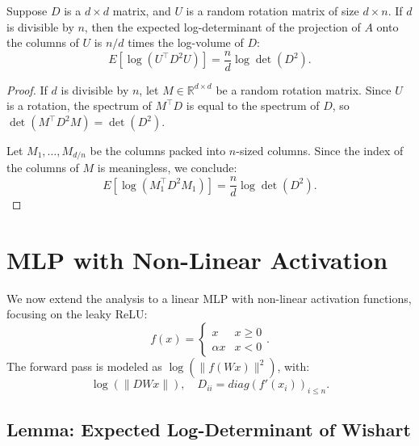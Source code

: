 \begin{corollary}
Suppose \( D \) is a \( d \times d \) matrix, and \( U \) is a random rotation matrix of size \( d \times n \). If \( d \) is divisible by \( n \), then the expected log-determinant of the projection of \( A \) onto the columns of \( U \) is \( n/d \) times the log-volume of \( D \):
\begin{equation}
E \left[\log\left(U^\top D^2 U\right)\right] = \frac{n}{d} \log \det(D^2).
\end{equation}
\end{corollary}

\begin{proof}
If \( d \) is divisible by \( n \), let \( M \in \mathbb{R}^{d \times d} \) be a random rotation matrix. Since \( U \) is a rotation, the spectrum of \( M^\top D \) is equal to the spectrum of \( D \), so \( \det(M^\top D^2 M) = \det(D^2) \).

Let \( M_1, \dots, M_{d/n} \) be the columns packed into \( n \)-sized columns. Since the index of the columns of \( M \) is meaningless, we conclude:
\begin{equation}
E \left[\log\left(M_1^\top D^2 M_1\right)\right] = \frac{n}{d} \log \det(D^2).
\end{equation}
\end{proof}

\section{MLP with Non-Linear Activation}

\begin{remark}
We now extend the analysis to a linear MLP with non-linear activation functions, focusing on the leaky ReLU:
\begin{equation}
f(x) = \begin{cases} x & x \ge 0 \\ \alpha x & x < 0 \end{cases}.
\end{equation}
The forward pass is modeled as \( \log(\|f(W x) \|^2) \), with:
\begin{equation}
\log(\|D W x \|), \quad D_{ii} = diag(f'(x_i))_{i \le n}.
\end{equation}
\end{remark}

\subsection{Lemma: Expected Log-Determinant of Wishart}

